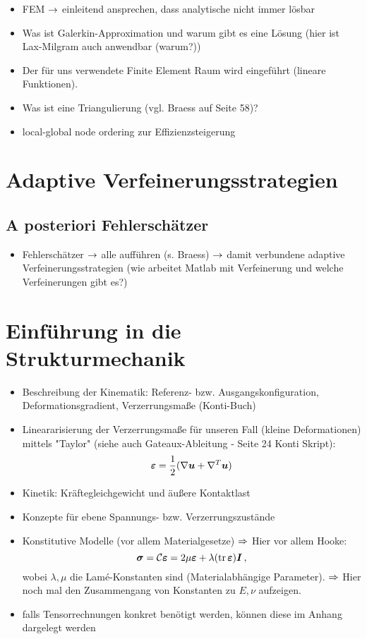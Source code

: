 \begin{itemize}
\item FEM $\rightarrow$ einleitend ansprechen, dass analytische nicht immer lösbar
\item Was ist Galerkin-Approximation und warum gibt es eine Lösung (hier ist Lax-Milgram auch anwendbar (warum?))
\item Der für uns verwendete Finite Element Raum wird eingeführt (lineare Funktionen).
\item Was ist eine Triangulierung (vgl. Braess auf Seite 58)?
\item local-global node ordering zur Effizienzsteigerung
\end{itemize}

\section{Adaptive Verfeinerungsstrategien}

\subsection{A posteriori Fehlerschätzer}

\begin{itemize}
\item Fehlerschätzer $\rightarrow$ alle aufführen (s. Braess) $\rightarrow$ damit verbundene adaptive Verfeinerungsstrategien (wie arbeitet Matlab mit Verfeinerung und welche Verfeinerungen gibt es?)
\end{itemize}

\section{Einführung in die Strukturmechanik}

\begin{itemize}
\item Beschreibung der Kinematik: Referenz- bzw. Ausgangskonfiguration, Deformationsgradient, Verzerrungsmaße (Konti-Buch)
\item Lineararisierung der Verzerrungsmaße für unseren Fall (kleine Deformationen) mittels "Taylor" (siehe auch Gateaux-Ableitung - Seite 24 Konti Skript):
\[
	\boldsymbol {\varepsilon} = \frac 1 2 (\nabla \boldsymbol u + \nabla^T \boldsymbol u)
\]
\item Kinetik: Kräftegleichgewicht und äußere Kontaktlast
\item Konzepte für ebene Spannungs- bzw. Verzerrungszustände
\item Konstitutive Modelle (vor allem Materialgesetze) $\Rightarrow$ Hier vor allem Hooke:
\[
	\boldsymbol \sigma = \mathcal C \boldsymbol {\varepsilon} = 2 \mu \boldsymbol {\varepsilon} + \lambda (\operatorname{tr} \boldsymbol {\varepsilon}) \boldsymbol I \, ,
\]
wobei $\lambda,\mu$ die Lamé-Konstanten sind (Materialabhängige Parameter). $\Rightarrow$ Hier noch mal den Zusammengang von Konstanten zu $E,\nu$ aufzeigen.
\item falls Tensorrechnungen konkret benötigt werden, können diese im Anhang dargelegt werden
\end{itemize}


\newpage


